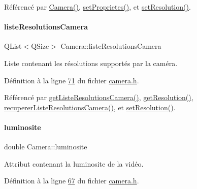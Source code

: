 Référencé par \hyperlink{camera_8cpp_source_l00012}{Camera()}, \hyperlink{camera_8cpp_source_l00108}{set\+Proprietes()}, et \hyperlink{camera_8cpp_source_l00186}{set\+Resolution()}.

\mbox{\label{class_camera_a96af62eaf7828664865b56e7c69e771c}} 
\paragraph{\texorpdfstring{liste\+Resolutions\+Camera}{listeResolutionsCamera}}
{\footnotesize\ttfamily Q\+List$<$Q\+Size$>$ Camera\+::liste\+Resolutions\+Camera\hspace{0.3cm}{\ttfamily [private]}}



Liste contenant les résolutions supportés par la caméra. 



Définition à la ligne \hyperlink{camera_8h_source_l00071}{71} du fichier \hyperlink{camera_8h_source}{camera.\+h}.



Référencé par \hyperlink{camera_8cpp_source_l00181}{get\+Liste\+Resolutions\+Camera()}, \hyperlink{camera_8cpp_source_l00121}{get\+Resolution()}, \hyperlink{camera_8cpp_source_l00152}{recuperer\+Liste\+Resolutions\+Camera()}, et \hyperlink{camera_8cpp_source_l00186}{set\+Resolution()}.

\mbox{\label{class_camera_aca5433bf19773161142d73009469b1ed}} 
\paragraph{\texorpdfstring{luminosite}{luminosite}}
{\footnotesize\ttfamily double Camera\+::luminosite\hspace{0.3cm}{\ttfamily [private]}}



Attribut contenant la luminosite de la vidéo. 



Définition à la ligne \hyperlink{camera_8h_source_l00067}{67} du fichier \hyperlink{camera_8h_source}{camera.\+h}.



